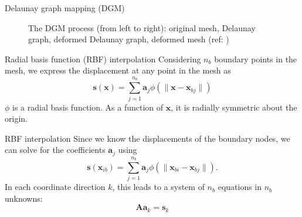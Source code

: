 \documentclass[t,12pt]{beamer}
\let\bld\boldsymbol
\begin{document}
\begin{frame}{Delaunay graph mapping (DGM)}
\begin{figure}
{ 	}
 	\caption{The DGM process (from left to right): original mesh, Delaunay graph, deformed Delaunay graph, deformed mesh (ref: )}
 	\label{fig:dgmprocess}
 \end{figure}
\end{frame}

\begin{frame}{Radial basis function (RBF) interpolation}
Considering $n_b$ boundary points in the mesh, we express the displacement at any point in the mesh as 
\begin{equation}
\mathbf{s}(\mathbf{x}) = \sum_{j=1}^{n_b} \mathbf{a}_j \phi(\lVert\mathbf{x} - \mathbf{x}_{bj}\rVert)
\label{eqn:rbf}
\end{equation}
$\phi$ is a radial basis function. As a function of $\bld{x}$, it is radially symmetric about the origin.
\end{frame}

\begin{frame}{RBF interpolation}
Since we know the displacements of the boundary nodes, we can solve for the coefficients $\mathbf{a}_j$ using
\begin{equation}
\mathbf{s}(\mathbf{x}_{ib}) = \sum_{j=1}^{n_b} \mathbf{a}_j \phi(\lVert\mathbf{x}_{bi} - \mathbf{x}_{bj}\rVert).
\end{equation}
In each coordinate direction $k$, this leads to a system of $n_b$ equations in $n_b$ unknowns:
\begin{equation}
\mathbf{A}\mathbf{a}_k = \mathbf{s}_k
\label{eqn:rbf_system}
\end{equation}
\end{frame}
\end{document}
